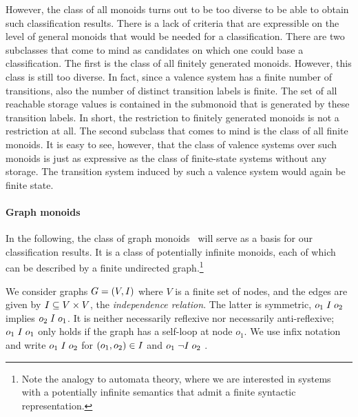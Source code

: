 \documentclass[../../diss.tex]{subfiles}
\begin{document}
However, the class of all monoids turns out to be too diverse to be able to obtain such classification results.
There is a lack of criteria that are expressible on the level of general monoids that would be needed for a classification.
There are two subclasses that come to mind as candidates on which one could base a classification.
The first is the class of all finitely generated monoids.
However, this class is still too diverse.
In fact, since a valence system has a finite number of transitions, also the number of distinct transition labels is finite.
The set of all reachable storage values is contained in the submonoid that is generated by these transition labels.
In short, the restriction to finitely generated monoids is not a restriction at all.
%
The second subclass that comes to mind is the class of all finite monoids.
It is easy to see, however, that the class of valence systems over such monoids is just as expressive as the class of finite-state systems without any storage.
The transition system induced by such a valence system would again be finite state.

\paragraph{Graph monoids}

In the following, the class of graph monoids~\cite{Zetzsche15d,Charney07} will serve as a basis for our classification results.
It is a class of potentially infinite monoids, each of which can be described by a finite undirected graph.\footnote{Note the analogy to automata theory, where we are interested in systems with a potentially infinite semantics that admit a finite syntactic representation.}

We consider graphs $G = (V,I)$ where $V$ is a finite set of nodes, and the edges are given by $I \subseteq V \times V$, the \emph{independence relation}.
The latter is symmetric, \ie $o_1 \mathrel{I} o_2$ implies $o_2 \mathrel{I} o_1$.
It is neither necessarily reflexive nor necessarily anti-reflexive; $o_1 \mathrel{I} o_1$ only holds if the graph has a self-loop at node $o_1$.
We use infix notation and write $o_1 \mathrel{I} o_2$ for $(o_1, o_2) \in I$ and $o_1 \mathrel{\neg I} o_2$ .
\end{document}
